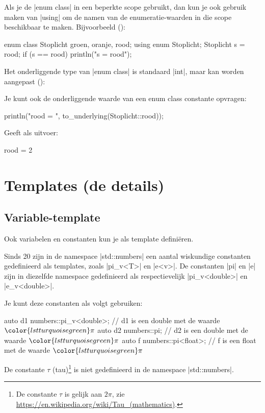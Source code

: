 \begin{cpplstShortInline}
Als je de |enum class| in een beperkte scope gebruikt, dan kun je ook gebruik maken van |using| om de namen van de enumeratie-waarden in die scope beschikbaar te maken.
Bijvoorbeeld ():
\begin{cpplstfragment}
	enum class Stoplicht {groen, oranje, rood};
	using enum Stoplicht;
	Stoplicht s = rood;
	if (s == rood) println("s = rood");
\end{cpplstfragment}

Het onderliggende type van |enum class| is standaard |int|, maar kan worden aangepast ():

Je kunt ook de onderliggende waarde van een enum class constante opvragen:
\begin{cpplstfragment}
	println("rood = {}", to_underlying(Stoplicht::rood));
\end{cpplstfragment}

Geeft als uitvoer:
\begin{coutput}
rood = 2
\end{coutput}

\chapter{Templates (de details)}
\label{sec:templatesdetails}
\section{Variable-template}
Ook variabelen en constanten kun je als template definiëren.

Sinds \Cpp{}20 zijn in de namespace |std::numbers| een aantal wiskundige constanten gedefinieerd als templates, zoals |pi_v<T>| en |e<v>|.
De constanten |pi| en |e| zijn in diezelfde namespace gedefinieerd als respectievelijk |pi_v<double>| en |e_v<double>|.

Je kunt deze constanten als volgt gebruiken:
\begin{cpplstfragment}[mathescape=true]
auto d1 {numbers::pi_v<double>}; // d1 is een double met de waarde $\color{lstturquoisegreen}\pi$
auto d2 {numbers::pi}; // d2 is een double met de waarde $\color{lstturquoisegreen}\pi$
auto f {numbers::pi<float>}; // f is een float met de waarde $\color{lstturquoisegreen}\pi$
\end{cpplstfragment}

De constante $\tau$ (tau)\footnote{%
	De constante $\tau$ is gelijk aan $2\pi$, zie \url{https://en.wikipedia.org/wiki/Tau_(mathematics)}.
} is niet gedefinieerd in de namespace |std::numbers|.


\end{cpplstShortInline}
